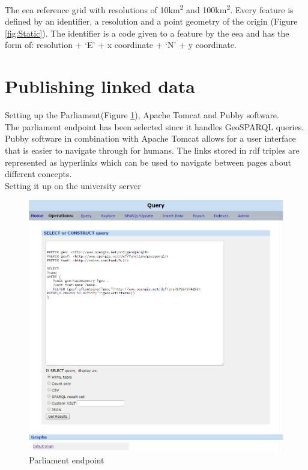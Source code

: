 The \ac{eea} reference grid with resolutions of 10km\textsuperscript{2} and 100km\textsuperscript{2}. Every feature is defined by an identifier, a resolution and a point geometry of the origin (Figure \ref{fig:Static}). The identifier is a code given to a feature by the \ac{eea} and has the form of: resolution + `E' + x coordinate + `N' + y coordinate.   

\section{Publishing linked data}
Setting up the Parliament(Figure \ref{fig:Parliament}), Apache Tomcat and Pubby software. \\

The parliament endpoint has been selected since it handles GeoSPARQL queries. \\

Pubby software in combination with Apache Tomcat allows for a user interface that is easier to navigate through for humans. The links stored in \ac{rdf} triples are represented as hyperlinks which can be used to navigate between pages about different concepts. \\

Setting it up on the university server

\begin{figure}
	\includegraphics[width=\linewidth]{figs/Parliament.PNG}
	\caption{Parliament endpoint}
	\label{fig:Parliament}
\end{figure}

